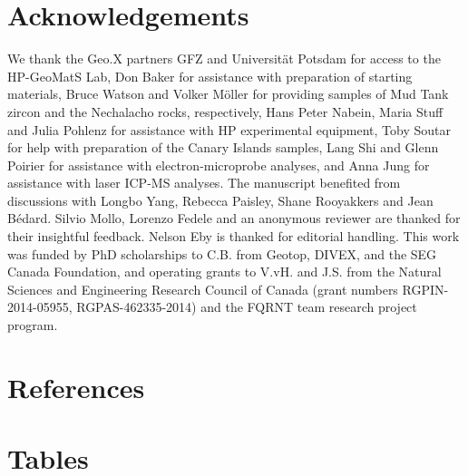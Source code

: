 \documentclass[final,authoryear,3p,times,twocolumn]{elsarticle}
\begin{document}

\section*{Acknowledgements} 
We thank the Geo.X partners GFZ and Universit\"at Potsdam for access to the HP-GeoMatS Lab, Don Baker for assistance with preparation of starting materials, Bruce Watson and Volker M\"oller for providing samples of Mud Tank zircon and the Nechalacho rocks, respectively, Hans Peter Nabein, Maria Stuff and Julia Pohlenz for assistance with HP experimental equipment, Toby Soutar for help with preparation of the Canary Islands samples, Lang Shi and Glenn Poirier for assistance with electron-microprobe analyses, and Anna Jung for assistance with laser ICP-MS analyses. The manuscript benefited from discussions with Longbo Yang, Rebecca Paisley, Shane Rooyakkers and Jean B\'edard. Silvio Mollo, Lorenzo Fedele and an anonymous reviewer are thanked for their insightful feedback. Nelson Eby is thanked for editorial handling.
	This work was funded by PhD scholarships to C.B. from Geotop, DIVEX, and the SEG Canada Foundation, and operating grants to V.vH. and J.S. from the Natural Sciences and Engineering Research Council of Canada (grant numbers RGPIN-2014-05955, RGPAS-462335-2014) and the FQRNT team research project program.%
 
\section*{References}
%





\clearpage
\onecolumn
\section{Tables}
\end{document}
